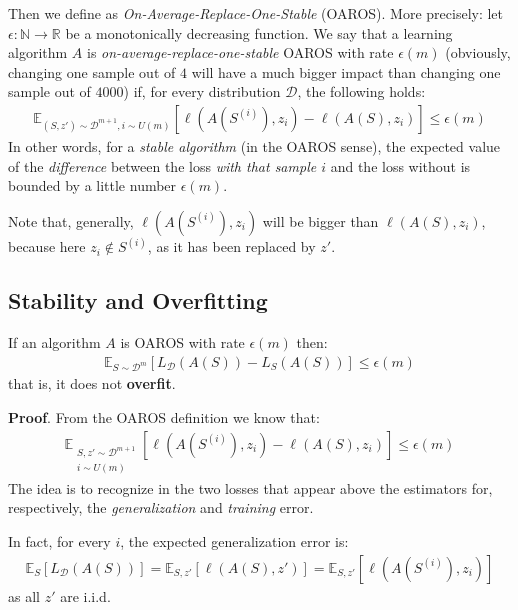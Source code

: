 \documentclass[../template.tex]{subfiles}
\begin{document}
Then we define  as \textit{On-Average-Replace-One-Stable} (OAROS). More precisely: let $\epsilon \colon \mathbb{N} \to \mathbb{R}$ be a monotonically decreasing function. We say that a learning algorithm $A$ is \textit{on-average-replace-one-stable} OAROS with rate $\epsilon(m)$ (obviously, changing one sample out of $4$ will have a much bigger impact than changing one sample out of $4000$) if, for every distribution $\mathcal{D}$, the following holds:     
\begin{align*}
    \mathbb{E}_{(S,z') \sim \mathcal{D}^{m+1}, i \sim U(m)} \left[\ell(A(S^{(i)}), z_i) - \ell(A(S), z_i)\right] \leq \epsilon (m)
\end{align*}
In other words, for a \textit{stable algorithm} (in the OAROS sense), the expected value of the \textit{difference} between the loss \textit{with that sample $i$} and the loss without is bounded by a little number $\epsilon(m)$.

Note that, generally, $\ell(A(S^{(i)}), z_i)$ will be bigger than $\ell(A(S), z_i)$, because here $z_i \not\in S^{(i)}$, as it has been replaced by $z'$.     

\subsection{Stability and Overfitting}
If an algorithm $A$ is OAROS with  rate $\epsilon(m)$ then:
\begin{align*}
    \mathbb{E}_{S \sim \mathcal{D}^m} \left[L_{\mathcal{D}}(A(S)) - L_S(A(S))\right] \leq \epsilon(m)
\end{align*} 
that is, it does not \textbf{overfit}.

\textbf{Proof}. From the OAROS definition we know that:
\begin{align}
    \mathbb{E}_{\substack{S,z' \sim \mathcal{D}^{m+1}\\ i \sim U(m)}}\left[\ell(A(S^{(i)}), z_i) - \ell(A(S), z_i)\right] \leq \epsilon(m)
    \label{eqn:oaros}
\end{align} 
The idea is to recognize in the two losses that appear above the estimators for, respectively, the \textit{generalization} and \textit{training} error.

In fact, for every $i$, the expected generalization error is:
\begin{align*}
    \mathbb{E}_S[L_{\mathcal{D}}(A(S))] = \mathbb{E}_{S,z'} [\ell(A(S), z')] = \mathbb{E}_{S,z'}[\ell(A(S^{(i)}), z_i)]
\end{align*} 
as all $z'$ are i.i.d.
\end{document}
